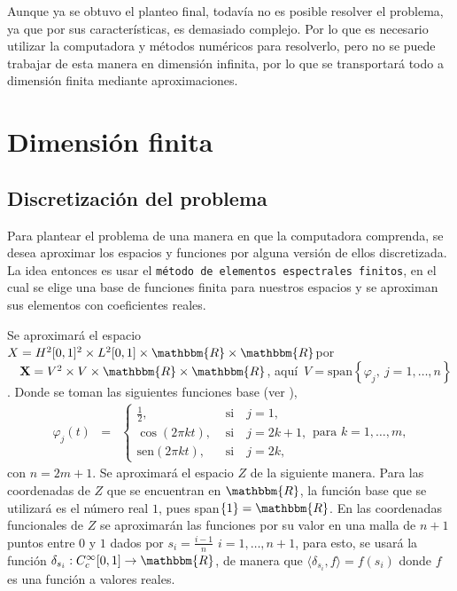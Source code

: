 \documentclass[a4paper,10pt]{book}
\newcommand{\R}{\mathbbm{R}}
\newcommand{\arr}{\rightarrow}
\newcommand{\la}{\langle}
\newcommand{\ra}{\rangle}
\begin{document}
Aunque ya se obtuvo el planteo final, todavía no es posible resolver el problema, ya que por sus características, es demasiado complejo. Por lo que es necesario utilizar la computadora y métodos numéricos para resolverlo, pero no se puede trabajar de esta manera en dimensión infinita, por lo que se transportará todo a dimensión finita mediante aproximaciones. 

\section{Dimensión finita}
\subsection{Discretización del problema}

Para plantear el problema de una manera en que la computadora comprenda, se desea aproximar los espacios y funciones por alguna versión de ellos discretizada. La idea entonces es usar el \texttt{método de elementos espectrales finitos}, en el cual se elige una base de funciones finita para nuestros espacios y se aproximan sus elementos con coeficientes reales.

Se aproximará el espacio 
$X=H^2[0,1]^2\times L^2[0,1]\times \R \times \R$\quad por $\quad\textbf{X}=V^2\times V\times \R\times \R$,
aquí $\, V=\mbox{span}\left\{\varphi_j,\ j=1,\ldots, n\right\}$.
Donde se toman las siguientes funciones base (ver \cite[Subsection 2.3.1]{stoer1993introduction}),
\begin{eqnarray}\label{funbase}
\varphi_j(t)&=&\left\{ \begin{array}{ll}
\frac{1}{2}, & \mbox{ si}\quad j=1,\\
\cos(2\pi kt), & \mbox{ si}\quad j=2k+1,\\
\mathrm{sen}(2\pi kt), & \mbox{ si}\quad j=2k,
\end{array}
\right.\mbox{para } k=1,\ldots,m,
\end{eqnarray}
con $n=2m+1$. Se aproximará el espacio $Z$ de la siguiente manera.
Para las coordenadas de $Z$ que se encuentran en $\R$, la función base que se utilizará es el número real $1$, pues span$\{1\}=\R$. En las coordenadas funcionales de $Z$ se aproximarán las funciones por su valor en una malla de $n+1$ puntos entre $0$ y $1$ dados por $s_i=\frac{i-1}{n}$ $i=1,\ldots,n+1$, para esto, se usará la función $\delta_{s_i}:C_c^\infty[0,1]\arr\R$, de manera que $\la\delta_{s_i},f\ra=f(s_i)$ donde $f$ es una función a valores reales.
\end{document}
